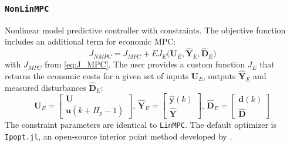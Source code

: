 \subsubsection{\textnormal{\texttt{NonLinMPC}}}
Nonlinear model predictive controller with constraints. The objective function includes an additional term for economic MPC:
\begin{equation}\label{eq:J_NMPC}
J_{\mathit{NMPC}} = J_{\mathit{MPC}} 
    + E J_E\big(\mathbf{U}_E, \mathbf{\hat{Y}}_E, \mathbf{\hat{D}}_E\big)
\end{equation}
with $J_{\mathit{MPC}}$ from \eqref{eq:J_MPC}. The user provides a custom function $J_E$ that returns the economic costs for a given set of inputs $\mathbf{U}_E$, outputs $\mathbf{\hat{Y}}_E$ and measured disturbances $\mathbf{\hat{D}}_E$:
\begin{equation}
\mathbf{U}_E = 
\begin{bmatrix}
    \mathbf{U} \\ \mathbf{u}(k+H_p-1)
\end{bmatrix}\!,\,
\mathbf{\hat{Y}}_E = 
\begin{bmatrix}
    \mathbf{\hat{y}}(k) \\ \mathbf{\hat{Y}}
\end{bmatrix}\!,\, 
\mathbf{\hat{D}}_E = 
\begin{bmatrix}
    \mathbf{d}(k) \\ \mathbf{\hat{D}}
\end{bmatrix} 
\end{equation} 
The constraint parameters are identical to \texttt{LinMPC}. The default optimizer is \texttt{Ipopt.jl}, an open-source interior point method developed by \citet{ipopt}.

